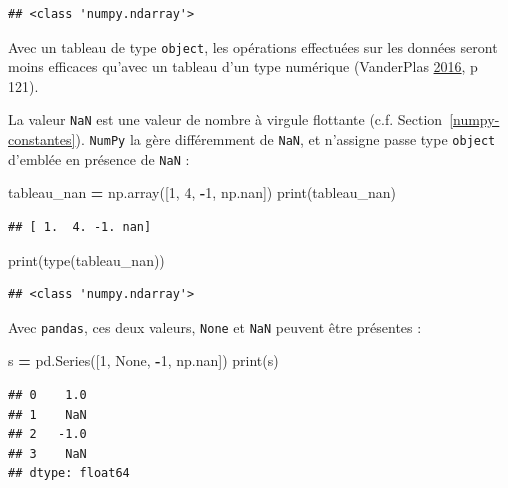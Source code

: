 \documentclass[12pt,]{book}
\newenvironment{Shaded}{\begin{snugshade}}{\end{snugshade}}
\newcommand{\DecValTok}[1]{\textcolor[rgb]{0.00,0.00,0.81}{#1}}
\newcommand{\VariableTok}[1]{\textcolor[rgb]{0.00,0.00,0.00}{#1}}
\newcommand{\OperatorTok}[1]{\textcolor[rgb]{0.81,0.36,0.00}{\textbf{#1}}}
\newcommand{\BuiltInTok}[1]{#1}
\newcommand{\NormalTok}[1]{#1}
\numberwithin{equation}{section}
\numberwithin{countremarque}{section}
\begin{document}
\begin{lstlisting}
## <class 'numpy.ndarray'>
\end{lstlisting}

Avec un tableau de type \texttt{object}, les opérations effectuées sur
les données seront moins efficaces qu'avec un tableau d'un type
numérique (VanderPlas
\protect\hyperlink{ref-vanderplas2016python}{2016}, p 121).

La valeur \texttt{NaN} est une valeur de nombre à virgule flottante
(c.f. Section~\ref{numpy-constantes}). \texttt{NumPy} la gère
différemment de \texttt{NaN}, et n'assigne passe type \texttt{object}
d'emblée en présence de \texttt{NaN} :

\begin{Shaded}
\begin{Highlighting}[]
\NormalTok{tableau_nan }\OperatorTok{=}\NormalTok{ np.array([}\DecValTok{1}\NormalTok{, }\DecValTok{4}\NormalTok{, }\OperatorTok{-}\DecValTok{1}\NormalTok{, np.nan])}
\BuiltInTok{print}\NormalTok{(tableau_nan)}
\end{Highlighting}
\end{Shaded}

\begin{lstlisting}
## [ 1.  4. -1. nan]
\end{lstlisting}

\begin{Shaded}
\begin{Highlighting}[]
\BuiltInTok{print}\NormalTok{(}\BuiltInTok{type}\NormalTok{(tableau_nan))}
\end{Highlighting}
\end{Shaded}

\begin{lstlisting}
## <class 'numpy.ndarray'>
\end{lstlisting}

Avec \texttt{pandas}, ces deux valeurs, \texttt{None} et \texttt{NaN}
peuvent être présentes :

\begin{Shaded}
\begin{Highlighting}[]
\NormalTok{s }\OperatorTok{=}\NormalTok{ pd.Series([}\DecValTok{1}\NormalTok{, }\VariableTok{None}\NormalTok{, }\OperatorTok{-}\DecValTok{1}\NormalTok{, np.nan])}
\BuiltInTok{print}\NormalTok{(s)}
\end{Highlighting}
\end{Shaded}

\begin{lstlisting}
## 0    1.0
## 1    NaN
## 2   -1.0
## 3    NaN
## dtype: float64
\end{lstlisting}
\end{document}
